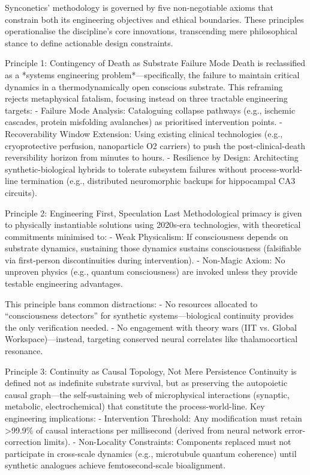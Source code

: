 \documentclass[10pt]{article}
\begin{document}
\begin{sloppypar}
  Synconetics’ methodology is governed by five non-negotiable axioms that constrain both its engineering objectives and ethical boundaries. These principles operationalise the discipline’s core innovations, transcending mere philosophical stance to define actionable design constraints.

  Principle 1: Contingency of Death as Substrate Failure Mode
  Death is reclassified as a *systems engineering problem*—specifically, the failure to maintain critical dynamics in a thermodynamically open conscious substrate. This reframing rejects metaphysical fatalism, focusing instead on three tractable engineering targets:
  - Failure Mode Analysis: Cataloguing collapse pathways (e.g., ischemic cascades, protein misfolding avalanches) as prioritised intervention points.
  - Recoverability Window Extension: Using existing clinical technologies (e.g., cryoprotective perfusion, nanoparticle O2 carriers) to push the post-clinical-death reversibility horizon from minutes to hours.
  - Resilience by Design: Architecting synthetic-biological hybrids to tolerate subsystem failures without process-world-line termination (e.g., distributed neuromorphic backups for hippocampal CA3 circuits).

  Principle 2: Engineering First, Speculation Last
  Methodological primacy is given to physically instantiable solutions using 2020s-era technologies, with theoretical commitments minimised to:
  - Weak Physicalism: If consciousness depends on substrate dynamics, sustaining those dynamics sustains consciousness (falsifiable via first-person discontinuities during intervention).
  - Non-Magic Axiom: No unproven physics (e.g., quantum consciousness) are invoked unless they provide testable engineering advantages.

  This principle bans common distractions:
  - No resources allocated to “consciousness detectors” for synthetic systems—biological continuity provides the only verification needed.
  - No engagement with theory wars (IIT vs. Global Workspace)—instead, targeting conserved neural correlates like thalamocortical resonance.

  Principle 3: Continuity as Causal Topology, Not Mere Persistence
  Continuity is defined not as indefinite substrate survival, but as preserving the autopoietic causal graph—the self-sustaining web of microphysical interactions (synaptic, metabolic, electrochemical) that constitute the process-world-line. Key engineering implications:
  - Intervention Threshold: Any modification must retain >99.9\% of causal interactions per millisecond (derived from neural network error-correction limits).
  - Non-Locality Constraints: Components replaced must not participate in cross-scale dynamics (e.g., microtubule quantum coherence) until synthetic analogues achieve femtosecond-scale bioalignment.


\end{sloppypar}
\end{document}
